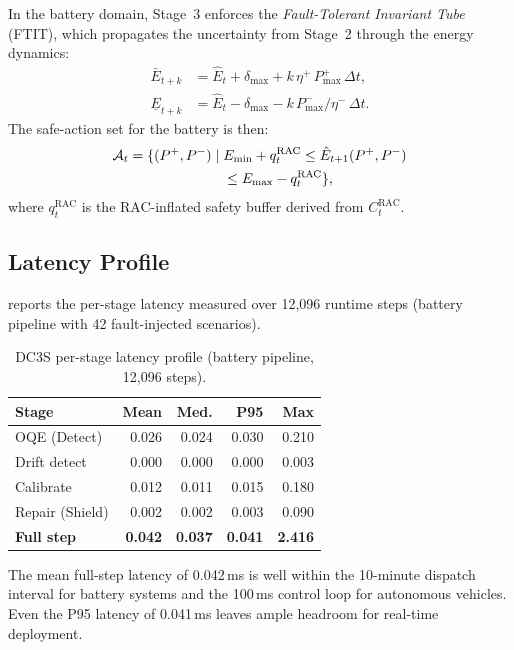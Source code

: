 In the battery domain, Stage~3 enforces the \emph{Fault-Tolerant Invariant Tube}
(FTIT), which propagates the uncertainty from Stage~2 through the energy dynamics:
\begin{align}
  \bar{E}_{t+k} &= \hat{E}_t + \delta_{\max} + k\,\eta^{+}\,P_{\max}^{+}\,\Delta t, \label{eq:ftit_upper}\\
  \underline{E}_{t+k} &= \hat{E}_t - \delta_{\max} - k\,P_{\max}^{-}/\eta^{-}\,\Delta t. \label{eq:ftit_lower}
\end{align}
The safe-action set for the battery is then:
\begin{equation}
  \begin{aligned}
  \mathcal{A}_t = \{(P^+,P^-)\mid\;&
    E_{\min}+q_t^{\mathrm{RAC}}
      \le \hat{E}_{t+1}(P^+,P^-) \\
    &\le E_{\max}-q_t^{\mathrm{RAC}}\},
  \end{aligned}
\end{equation}
where $q_t^{\mathrm{RAC}}$ is the RAC-inflated safety buffer derived from
$C_t^{\mathrm{RAC}}$.

\subsection{Latency Profile}

 reports the per-stage latency measured over 12{,}096
runtime steps (battery pipeline with 42 fault-injected scenarios).

\begin{table}[h]
\caption{DC3S per-stage latency profile (battery pipeline, 12{,}096 steps).}
\label{tab:dc3s_latency}
\centering\scriptsize
\begin{tabular}{lrrrr}
\toprule
\textbf{Stage} & \textbf{Mean} & \textbf{Med.} & \textbf{P95} & \textbf{Max} \\
\midrule
OQE (Detect)      & 0.026 & 0.024 & 0.030 & 0.210 \\
Drift detect      & 0.000 & 0.000 & 0.000 & 0.003 \\
Calibrate         & 0.012 & 0.011 & 0.015 & 0.180 \\
Repair (Shield)   & 0.002 & 0.002 & 0.003 & 0.090 \\
\midrule
\textbf{Full step}& \textbf{0.042} & \textbf{0.037} & \textbf{0.041} & \textbf{2.416} \\
\bottomrule
\end{tabular}
\end{table}

The mean full-step latency of 0.042\,ms is well within the 10-minute dispatch interval for
battery systems and the 100\,ms control loop for autonomous vehicles.  Even the P95
latency of 0.041\,ms leaves ample headroom for real-time deployment.

